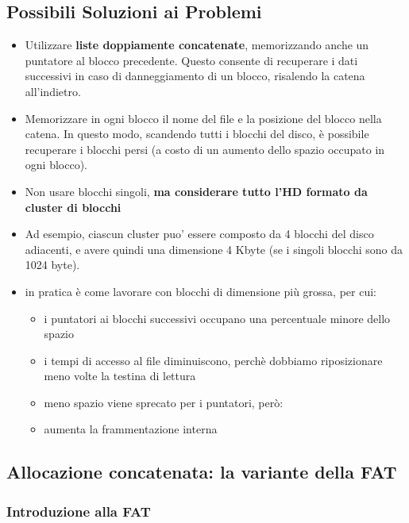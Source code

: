 \subsection{Possibili Soluzioni ai Problemi}
\begin{itemize}
    \item Utilizzare \textbf{liste doppiamente concatenate}, memorizzando anche un puntatore al blocco precedente. Questo consente di recuperare i dati successivi in caso di danneggiamento di un blocco, risalendo la catena all’indietro.
    \item Memorizzare in ogni blocco il nome del file e la posizione del blocco nella catena. In questo modo, scandendo tutti i blocchi del disco, è possibile recuperare i blocchi persi (a costo di un aumento dello spazio occupato in ogni blocco).
    \item Non usare blocchi singoli, \textbf{ma considerare tutto l’HD formato da cluster di blocchi }
    \item Ad esempio, ciascun cluster puo’ essere composto da 4 blocchi del disco adiacenti, e avere quindi una dimensione 4 Kbyte (se i singoli blocchi sono da 1024 byte).
    \item in pratica è come lavorare con blocchi di dimensione più grossa, per cui:
    \begin{itemize}
        \item i puntatori ai blocchi successivi occupano una percentuale minore dello spazio
        \item i tempi di accesso al file diminuiscono, perchè dobbiamo riposizionare meno volte la testina di lettura
        \item meno spazio viene sprecato per i puntatori, però:
        \item aumenta la frammentazione interna
    \end{itemize}
\end{itemize}

\subsection{Allocazione concatenata: la variante della FAT}

\subsubsection{Introduzione alla FAT}

